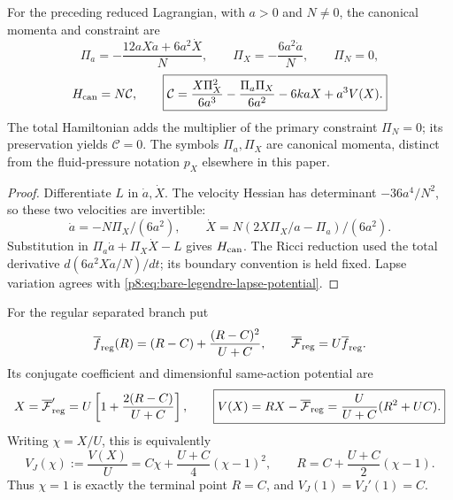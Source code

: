 \documentclass[12pt,a4paper]{article}
\begin{document}
\begin{proposition}
\label{p8:prop:complete-flrw-canonical-constraint}
For the preceding reduced Lagrangian, with \(a>0\) and \(N\ne0\),
the canonical momenta and constraint are
\[
 \Pi_a=-\frac{12aX\dot a+6a^2\dot X}{N},\qquad
 \Pi_X=-\frac{6a^2\dot a}{N},\qquad \Pi_N=0,
\]
\[
 H_{\rm can}=N\mathcal C,\qquad
 \boxed{\mathcal C=\frac{X\Pi_X^2}{6a^3}
 -\frac{\Pi_a\Pi_X}{6a^2}-6kaX+a^3V(X).}
\]
The total Hamiltonian adds the multiplier of the primary constraint
\(\Pi_N=0\); its preservation yields \(\mathcal C=0\).
The symbols \(\Pi_a,\Pi_X\) are canonical momenta, distinct from the
fluid-pressure notation \(p_X\) elsewhere in this paper.
\end{proposition}
\begin{proof}
Differentiate \(L\) in \(\dot a,\dot X\). The velocity Hessian has
determinant \(-36a^4/N^2\), so these two velocities are invertible:
\[
 \dot a=-N\Pi_X/(6a^2),\qquad
 \dot X=N(2X\Pi_X/a-\Pi_a)/(6a^2).
\]
Substitution in \(\Pi_a\dot a+\Pi_X\dot X-L\) gives \(H_{\rm can}\).
The Ricci reduction used the total derivative
\(d(6a^2X\dot a/N)/dt\); its boundary convention is held fixed.
Lapse variation agrees with
\eqref{p8:eq:bare-legendre-lapse-potential}.
\end{proof}
For the regular separated branch put
\[
 \overline f_{\rm reg}(R)
 =(R-C)+\frac{(R-C)^2}{U+C},
 \qquad
 \overline{\mathcal F}_{\rm reg}=U\overline f_{\rm reg}.
\]
Its conjugate coefficient and dimensionful same-action potential are
\[
 X=\overline{\mathcal F}_{\rm reg}'
 =U\left[1+\frac{2(R-C)}{U+C}\right],
 \qquad
 \boxed{V(X)=R X-\overline{\mathcal F}_{\rm reg}
 =\frac{U}{U+C}(R^2+UC).}
\]
Writing \(\chi=X/U\), this is equivalently
\begin{equation}
\label{p8:eq:regular-separated-jordan-potential}
 \boxed{
 V_J(\chi):=\frac{V(X)}U
 =C\chi+\frac{U+C}{4}(\chi-1)^2,\qquad
 R=C+\frac{U+C}{2}(\chi-1).}
\end{equation}
Thus \(\chi=1\) is exactly the terminal point \(R=C\), and
\(V_J(1)=V_J'(1)=C\).
\end{document}
